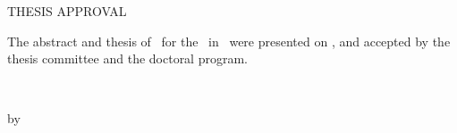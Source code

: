 \thispagestyle{empty}  %



\long{}

 \begin{center} THESIS APPROVAL \end{center}
        \noindent The abstract and thesis of \thesisAuthor~for 
        the \thesisDegree~in \thesisDept~were presented on \thesisDate,
        and accepted by the thesis committee and the doctoral program.        

    \signature{COMMITTEE APPROVALS:}\thesisAdvisor    
    \signature{\ }\thesisCommitteeOne
    \signature{\ }\thesisCommitteeTwo

\clearpage  %
\thispagestyle{empty}

\begin{center}
  ~\\
  \thesisTitle
\end{center}

\vfill\vfill

\begin{center}
  by\\
  \thesisAuthor
\end{center}

\vfill

